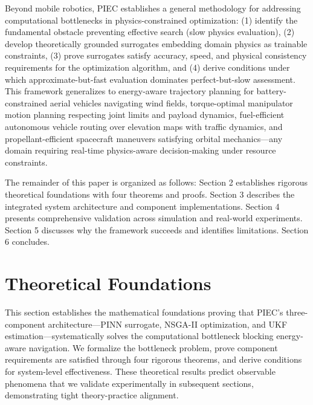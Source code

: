 \documentclass[pdflatex,sn-nature]{sn-jnl}%
\begin{document}
Beyond mobile robotics, PIEC establishes a general methodology for addressing computational bottlenecks in physics-constrained optimization: (1) identify the fundamental obstacle preventing effective search (slow physics evaluation), (2) develop theoretically grounded surrogates embedding domain physics as trainable constraints, (3) prove surrogates satisfy accuracy, speed, and physical consistency requirements for the optimization algorithm, and (4) derive conditions under which approximate-but-fast evaluation dominates perfect-but-slow assessment. This framework generalizes to energy-aware trajectory planning for battery-constrained aerial vehicles navigating wind fields, torque-optimal manipulator motion planning respecting joint limits and payload dynamics, fuel-efficient autonomous vehicle routing over elevation maps with traffic dynamics, and propellant-efficient spacecraft maneuvers satisfying orbital mechanics—any domain requiring real-time physics-aware decision-making under resource constraints.

The remainder of this paper is organized as follows: Section 2 establishes rigorous theoretical foundations with four theorems and proofs. Section 3 describes the integrated system architecture and component implementations. Section 4 presents comprehensive validation across simulation and real-world experiments. Section 5 discusses why the framework succeeds and identifies limitations. Section 6 concludes.



\section{Theoretical Foundations}

This section establishes the mathematical foundations proving that PIEC's three-component architecture—PINN surrogate, NSGA-II optimization, and UKF estimation—systematically solves the computational bottleneck blocking energy-aware navigation. We formalize the bottleneck problem, prove component requirements are satisfied through four rigorous theorems, and derive conditions for system-level effectiveness. These theoretical results predict observable phenomena that we validate experimentally in subsequent sections, demonstrating tight theory-practice alignment.
\end{document}
